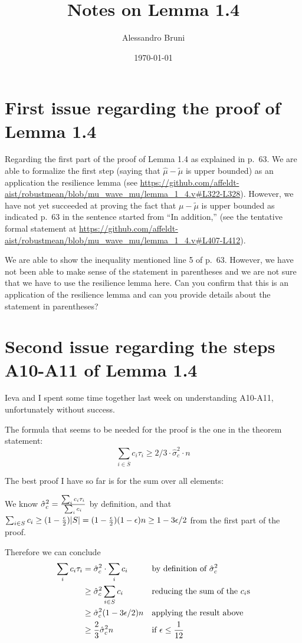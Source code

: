\documentclass[11pt]{article}
\author{Alessandro Bruni}
\date{\today}
\title{Notes on Lemma 1.4}
\begin{document}
\maketitle

\section{First issue regarding the proof of Lemma 1.4}

Regarding the first part of the proof of Lemma 1.4 as explained in p.\ 63.
We are able to formalize the first step (saying that $\hat\mu - \widetilde{\mu}$ is
upper bounded) as an application the resilience lemma (see
\url{https://github.com/affeldt-aist/robustmean/blob/mu_wave_mu/lemma_1_4.v#L322-L328}).
However, we have not yet succeeded at proving the fact that $\mu - \widetilde{\mu}$
is upper bounded as indicated p.\ 63 in the sentence started from ``In addition,''
(see the tentative formal statement at
\url{https://github.com/affeldt-aist/robustmean/blob/mu_wave_mu/lemma_1_4.v#L407-L412}).

We are able to show the inequality mentioned line 5 of p.\ 63. However,
we have not been able to make sense of the statement in parentheses and we are
not sure that we have to use the resilience lemma here.
Can you confirm that this is an application of the resilience lemma
and can you provide details about the statement in parentheses?

\section{Second issue regarding the steps A10-A11 of Lemma 1.4}

Ieva and I spent some time together last week on understanding A10-A11, unfortunately without success.

The formula that seems to be needed for the proof is the one in the theorem statement:
\[ \sum_{i \in \overline S} c_i \tau_i \ge 2/3 \cdot \hat\sigma_c^2 \cdot n \]

The best proof I have so far is for the sum over all elements:

We know \(\hat\sigma_c^2 = {\sum_i c_i \tau_i \over \sum_i c_i}\) by definition, and that  \(\sum_{i \in S} c_i \ge (1-{\epsilon\over 2})|S| = (1-{\epsilon\over 2})(1-\epsilon)n \ge 1-3\epsilon/2\) from the first part of the proof.

Therefore we can conclude
\begin{align*}
\sum_i c_i \tau_i &= \hat\sigma_c^2 \cdot \sum_i c_i &&\text{by definition of }\hat\sigma_c^2\\
&\ge \hat\sigma_c^2 \sum_{i \in S} c_i &&\text{reducing the sum of the $c_i$s}\\
&\ge \hat\sigma_c^2 (1-3\epsilon/2)n &&\text{applying the result above}\\
&\ge {2\over 3} \hat\sigma_c^2 n &&\text{if }\epsilon \le {1\over12}
\end{align*}
\end{document}
